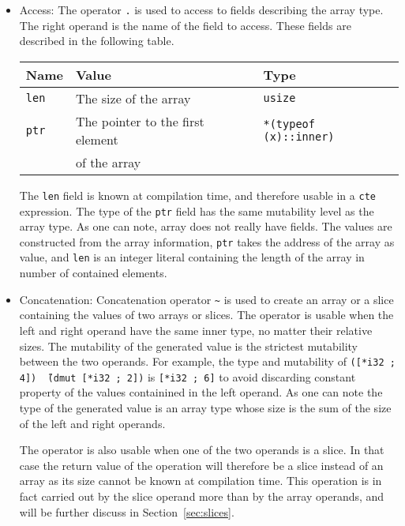 \begin{itemize}
\item Access: The operator \texttt{.} is used to access to fields describing the
  array type. The right operand is the name of the field to access. These fields
  are described in the following table.
  \vspace{-20pt}%
\begin{center}\begin{adjustbox}{max width=\linewidth}
  \begin{tabular}{|l|ll|}
    \hline
    Name & Value & Type\\
    \hline
    \hline
    \texttt{len} & The size of the array & \texttt{usize} \\
    \texttt{ptr} & The pointer to the first element  & \texttt{*(typeof (x)::inner)} \\
    & of the array & \\
    \hline
  \end{tabular}
\end{adjustbox}\end{center}

  The \texttt{len} field is known at compilation time, and therefore usable in a
  \texttt{cte} expression. The type of the \texttt{ptr} field has the same
  mutability level as the array type. As one can note, array does not really
  have fields. The values are constructed from the array information,
  \texttt{ptr} takes the address of the array as value, and \texttt{len} is an
  integer literal containing the length of the array in number of contained
  elements.

\item Concatenation: Concatenation operator \texttt{\~} is used to create an
  array or a slice containing the values of two arrays or slices. The operator
  is usable when the left and right operand have the same inner type, no matter
  their relative sizes. The mutability of the generated value is the strictest
  mutability between the two operands. For example, the type and mutability of
  \texttt{([*i32 ; 4]) \~\ (dmut [*i32 ; 2])} is \texttt{[*i32 ; 6]} to avoid
  discarding constant property of the values containined in the left operand. As
  one can note the type of the generated value is an array type whose size is
  the sum of the size of the left and right operands.

  The operator is also usable when one of the two operands is a slice. In that
  case the return value of the operation will therefore be a slice instead of an
  array as its size cannot be known at compilation time. This operation is in
  fact carried out by the slice operand more than by the array operands, and
  will be further discuss in Section~\ref{sec:slices}.


\end{itemize}
